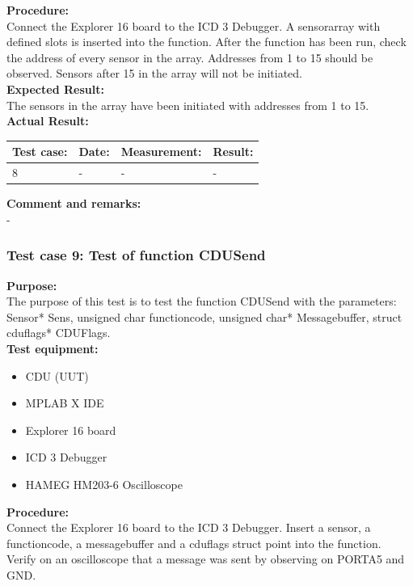 \textbf{Procedure:}\\
Connect the Explorer 16 board to the ICD 3 Debugger. A sensorarray with defined slots is inserted into the function. After the function has been run, check the address of every sensor in the array. Addresses from 1 to 15 should be observed. Sensors after 15 in the array will not be initiated.\\

\textbf{Expected Result:}\\
The sensors in the array have been initiated with addresses from 1 to 15.\\

\textbf{Actual Result:}\\
\begin{table}[H]
\centering
\begin{tabular}{|p{2cm}|p{2cm}|p{3cm}|p{2cm}|}\hline
\textbf{Test case:} & \textbf{Date:} & \textbf{Measurement:} & \textbf{Result:} \\ \hline
8 & - & - & - \\ \hline
\end{tabular}
\end{table}

\textbf{Comment and remarks:}\\
-\\

\subsubsection{Test case 9: Test of function CDUSend }
\textbf{Purpose:}\\
The purpose of this test is to test the function CDUSend with the parameters: Sensor* Sens, unsigned char functioncode, unsigned char* Messagebuffer, struct cduflags* CDUFlags.\\

\textbf{Test equipment:}
\begin{itemize}
\item CDU (UUT)
\item MPLAB X IDE
\item Explorer 16 board
\item ICD 3 Debugger
\item HAMEG HM203-6 Oscilloscope
\end{itemize}

\textbf{Procedure:}\\
Connect the Explorer 16 board to the ICD 3 Debugger. Insert a sensor, a functioncode, a messagebuffer and a cduflags struct point into the function. Verify on an oscilloscope that a message was sent by observing on PORTA5 and GND.\\

